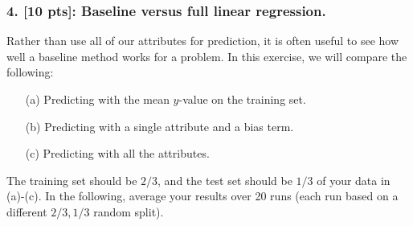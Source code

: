 \documentclass{article}
\begin{document}
\subsubsection*{4. [10 pts]: Baseline versus full linear regression.}
Rather than use all of our attributes for prediction, it is often useful to see how well a baseline method works for a problem. In this exercise, we will compare the following:
\begin{enumerate}
    \item[(a)] Predicting with the mean \(y\)-value on the training set.
    \item[(b)] Predicting with a single attribute and a bias term.
    \item[(c)] Predicting with all the attributes.
\end{enumerate}

The training set should be \(2/3\), and the test set should be \(1/3\) of your data in (a)-(c). In the following, average your results over 20 runs (each run based on a different \(2/3, 1/3\) random split).
\end{document}
